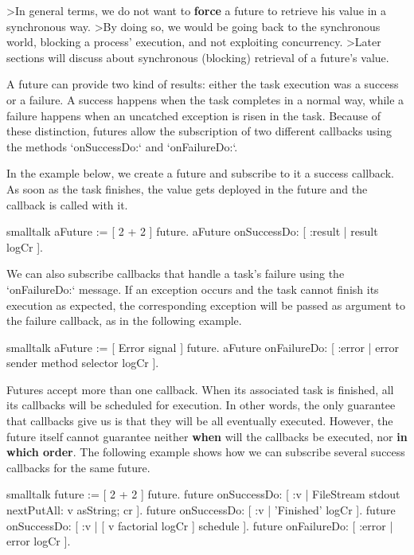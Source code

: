 \documentclass[10pt,twoside,english]{_support/latex/sbabook/sbabook}
\begin{document}
\textgreater{}In general terms, we do not want to \textbf{force} a future to retrieve his value in a synchronous way.
\textgreater{}By doing so, we would be going back to the synchronous world, blocking a process' execution, and not exploiting concurrency.
\textgreater{}Later sections will discuss about synchronous (blocking) retrieval of a future's value.

A future can provide two kind of results: either the task execution was a success or a failure. A success happens when the task completes in a normal way, while a failure happens when an uncatched exception is risen in the task. Because of these distinction, futures allow the subscription of two different callbacks using the methods `onSuccessDo:` and `onFailureDo:`.

In the example below, we create a future and subscribe to it a success callback. As soon as the task finishes, the value gets deployed in the future and the callback is called with it.

\begin{displaycode}{smalltalk}
aFuture := [ 2 + 2 ] future.
aFuture onSuccessDo: [ :result | result logCr ].
\end{displaycode}

We can also subscribe callbacks that handle a task's failure using the `onFailureDo:` message. If an exception occurs and the task cannot finish its execution as expected, the corresponding exception will be passed as argument to the failure callback, as in the following example.

\begin{displaycode}{smalltalk}
aFuture := [ Error signal ] future.
aFuture onFailureDo: [ :error | error sender method selector logCr ].
\end{displaycode}

Futures accept more than one callback. When its associated task is finished, all its callbacks will be scheduled for execution. In other words, the only guarantee that callbacks give us is that they will be all eventually executed. However, the future itself cannot guarantee neither \textbf{when} will the callbacks be executed, nor \textbf{in which order}. The following example shows how we can subscribe several success callbacks for the same future.

\begin{displaycode}{smalltalk}
future := [ 2 + 2 ] future.
future onSuccessDo: [ :v | FileStream stdout nextPutAll: v asString; cr ].
future onSuccessDo: [ :v | 'Finished' logCr ].
future onSuccessDo: [ :v | [ v factorial logCr ] schedule ].
future onFailureDo: [ :error | error logCr ].
\end{displaycode}
\end{document}
